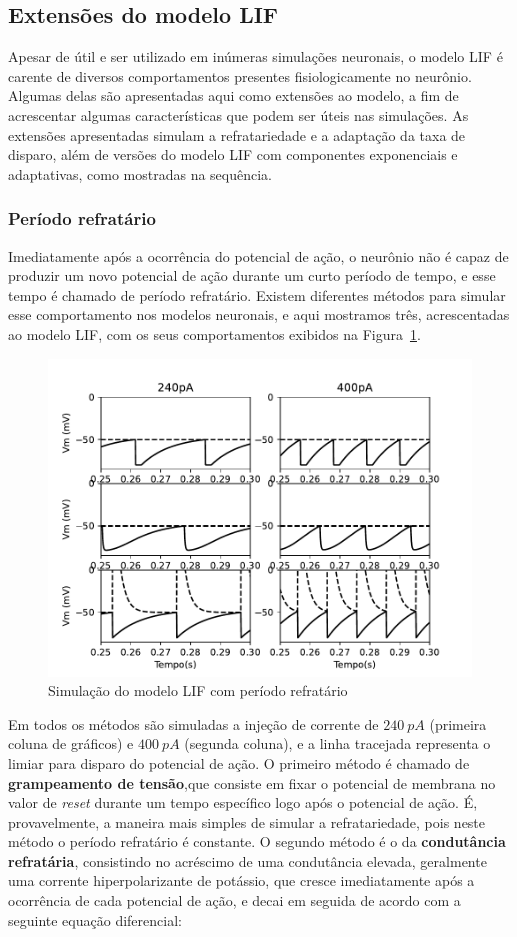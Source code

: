 
\subsection{Extensões do modelo LIF}
Apesar de útil e ser utilizado em inúmeras simulações neuronais, o modelo LIF é carente de diversos comportamentos presentes fisiologicamente no neurônio. Algumas delas são apresentadas aqui como extensões ao modelo, a fim de acrescentar algumas características que podem ser úteis nas simulações. As extensões apresentadas simulam a refratariedade e a adaptação da taxa de disparo, além de versões do modelo LIF com componentes exponenciais e adaptativas, como mostradas na sequência.
\subsubsection{Período refratário}
Imediatamente após a ocorrência do potencial de ação, o neurônio não é capaz de produzir um novo potencial de ação durante um curto período de tempo, e esse tempo é chamado de período refratário. Existem diferentes métodos para simular esse comportamento nos modelos neuronais, e aqui mostramos três, acrescentadas ao modelo LIF, com os seus comportamentos exibidos na Figura~\ref{fig:lifrefratario}.
\begin{figure}[tb]
	\centering
	\caption{Simulação do modelo LIF com período refratário}
	\label{fig:lifrefratario}
	\includegraphics[width=0.7\linewidth]{figs/lif_refratario}
\end{figure}
Em todos os métodos são simuladas a injeção de corrente de $240\ pA$ (primeira coluna de gráficos) e $400\ pA$ (segunda coluna), e a linha tracejada representa o limiar para disparo do potencial de ação. O primeiro método é chamado de \textbf{grampeamento de tensão},que consiste em fixar o potencial de membrana no valor de \textit{reset} durante um tempo específico logo após o potencial de ação. É, provavelmente, a maneira mais simples de simular a refratariedade, pois neste método o período refratário é constante. O segundo método é o da \textbf{condutância refratária}, consistindo no acréscimo de uma condutância elevada, geralmente uma corrente hiperpolarizante de potássio, que cresce imediatamente após a ocorrência de cada potencial de ação, e decai em seguida de acordo com a seguinte equação diferencial:
